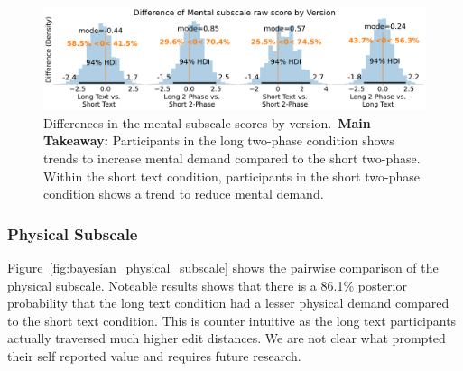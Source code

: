 \begin{figure}[h!]
    \centering
    \includegraphics[width=\textwidth]{content/image/cog/Mental_cog_diff_single_row.pdf}
    \caption{Differences in the mental subscale scores by version.~\textbf{Main Takeaway:} Participants in the long two-phase condition shows trends to increase mental demand compared to the short two-phase. Within the short text condition, participants in the short two-phase condition shows a trend to reduce mental demand.}
    \label{fig:bayesian_mental_subscale}
\end{figure}

\subsubsection{Physical Subscale}
Figure~\ref{fig:bayesian_physical_subscale} shows the pairwise comparison of the physical subscale. Noteable results shows that there is a 86.1\% posterior probability that the long text condition had a lesser physical demand compared to the short text condition. This is counter intuitive as the long text participants actually traversed much higher edit distances. We are not clear what prompted their self reported value and requires future research. 

